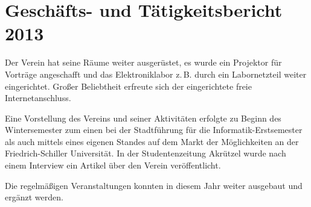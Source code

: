\documentclass[10pt, a4paper]{scrartcl}
\begin{document}
\section*{Geschäfts- und Tätigkeitsbericht 2013}
Der Verein hat seine Räume weiter ausgerüstet,
es wurde ein Projektor für Vorträge angeschafft und
das Elektroniklabor z.\,B. durch ein Labornetzteil weiter eingerichtet.
Großer Beliebtheit erfreute sich der eingerichtete freie Internetanschluss.

Eine Vorstellung des Vereins und seiner Aktivitäten erfolgte zu Beginn des Wintersemester
zum einen bei der Stadtführung für die Informatik-Erstsemester als auch mittels eines eigenen Standes 
auf dem Markt der Möglichkeiten an der Friedrich-Schiller Universität.
In der Studentenzeitung Akrützel wurde nach einem Interview ein Artikel über den Verein veröffentlicht.

Die regelmäßigen Veranstaltungen konnten in diesem Jahr weiter ausgebaut und ergänzt werden.
\end{document}
